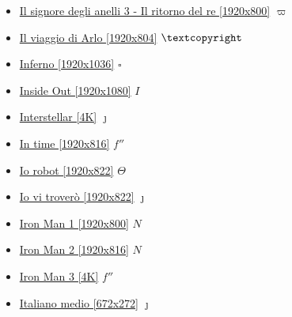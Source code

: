 \begin{itemize}
			\item \href{https://mega.nz/#!7BcVzIKD!vPTv-j6q84_s6HPRQnBNosn8MlXnjC9wfD_wzOcwBBk} {Il signore degli anelli 3 - Il ritorno del re [1920x800]}  $\varpi$ \\ 
			\item \href{https://mega.nz/#!nHw2mDKK!Npn0e_-BipE-Z4bIrM6omBpcDFFYY8fqPQFIvTOX6gs} {Il viaggio di Arlo [1920x804]}  $\textcopyright$ \\ 
			\item \href{https://mega.nz/#!btVGABqB!RARxrpjt7ux4z42rujks4bPiqVwP1P-xDUIaPRgO9h0} {Inferno [1920x1036]}  $\square$ \\ 
			\item \href{https://mega.nz/#!uk1DiZgB!D-kRkQJDB69yJjXYHt64CCVukLHWldaDr08T99oObhE} {Inside Out [1920x1080]}  $I$ \\ 
			\item \href{https://mega.nz/#!L6Q11aoA!PYB4fe40wiWQ2oCXaTfMB-mh5xt-ral4bUQ2XvekHAw} {Interstellar [4K]}  $\jmath$ \\ 
			\item \href{https://mega.nz/#!KC4X0bIB!6Zphkwxt5DlT5IHxwq4LREbO5JsQuSveYFyHMANOGuo} {In time [1920x816]}  $f''$ \\ 
			\item \href{https://mega.nz/#!xaIWWTpT!fTlHwSPIKDOMjCIJNXUBW1h53vEoN4SGHvaae3qfu8w} {Io robot [1920x822]}  $\varTheta$ \\ 
			\item \href{https://mega.nz/#!j7BmRJZD!qBrA7UW8vm6MXjldC9RIsOGxFqGzHysIouQPsbWdv0s} {Io vi troverò [1920x822]}  $\jmath$ \\ 
			\item \href{https://mega.nz/#!gahgADaA!goMdap55qLH5oS0k1C6P1oguVhrW10901-64n38zJOQ} {Iron Man 1 [1920x800]}  $N$ \\ 
			\item \href{https://mega.nz/#!gGxjEaiI!ogj9LjbSzo3RMG_om_xWbT9N7d0NuetIhcKp6bqkh0k} {Iron Man 2 [1920x816]}  $N$ \\ 
			\item \href{https://mega.nz/#!2GJ33KTK!uvRcYB8sZCiptM1EddY2EcN9DP0TNmtVFYMATr91wT4} {Iron Man 3 [4K]}  $f''$ \\ 
			\item \href{https://mega.nz/#!am5HDK6Y!kVTt6Rk9rGOISnQzA9rlOrbT2uznBCGv6G-tmwsrmyQ} {Italiano medio [672x272]}  $\jmath$ \\
					
		\end{itemize}	
	
